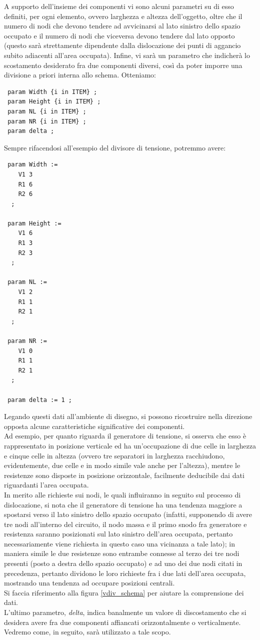 A supporto dell'insieme dei componenti vi sono alcuni parametri su di esso definiti, per ogni elemento, ovvero larghezza e altezza dell'oggetto, oltre che il numero di nodi che devono tendere ad avvicinarsi al lato sinistro dello spazio occupato e il numero di nodi che viceversa devono tendere dal lato opposto (questo sarà strettamente dipendente dalla dislocazione dei punti di aggancio subito adiacenti all'area occupata). Infine, vi sarà un parametro che indicherà lo scostamento desiderato fra due componenti diversi, così da poter imporre una divisione a priori interna allo schema. Otteniamo:
\small
\begin{verbatim}
 param Width {i in ITEM} ;
 param Height {i in ITEM} ;
 param NL {i in ITEM} ;
 param NR {i in ITEM} ;
 param delta ;
\end{verbatim}
\normalsize
Sempre rifacendosi all'esempio del divisore di tensione, potremmo avere:
\small
\begin{verbatim}
 param Width :=
    V1 3
    R1 6
    R2 6
  ;

 param Height :=
    V1 6
    R1 3
    R2 3
  ;

 param NL :=
    V1 2
    R1 1
    R2 1
  ;

 param NR :=
    V1 0
    R1 1
    R2 1
  ;

 param delta := 1 ;
\end{verbatim}
\normalsize
Legando questi dati all'ambiente di disegno, si possono ricostruire nella direzione opposta alcune caratteristiche significative dei componenti.\\
Ad esempio, per quanto riguarda il generatore di tensione, si osserva che esso è rappresentato in posizione verticale ed ha un'occupazione di due celle in larghezza e cinque celle in altezza (ovvero tre separatori in larghezza racchiudono, evidentemente, due celle e in modo simile vale anche per l'altezza), mentre le resistenze sono disposte in posizione orizzontale, facilmente deducibile dai dati riguardanti l'area occupata.\\
In merito alle richieste sui nodi, le quali influiranno in seguito sul processo di dislocazione, si nota che il generatore di tensione ha una tendenza maggiore a spostarsi verso il lato sinistro dello spazio occupato (infatti, supponendo di avere tre nodi all'interno del circuito, il nodo massa e il primo snodo fra generatore e resistenza saranno posizionati sul lato sinistro dell'area occupata, pertanto necessariamente viene richiesta in questo caso una vicinanza a tale lato); in maniera simile le due resistenze sono entrambe connesse al terzo dei tre nodi presenti (posto a destra dello spazio occupato) e ad uno dei due nodi citati in precedenza, pertanto dividono le loro richieste fra i due lati dell'area occupata, mostrando una tendenza ad occupare posizioni centrali.\\
Si faccia riferimento alla figura \ref{vdiv_schema} per aiutare la comprensione dei dati.\\
L'ultimo parametro, \textit{delta}, indica banalmente un valore di discostamento che si desidera avere fra due componenti affiancati orizzontalmente o verticalmente. Vedremo come, in seguito, sarà utilizzato a tale scopo.


